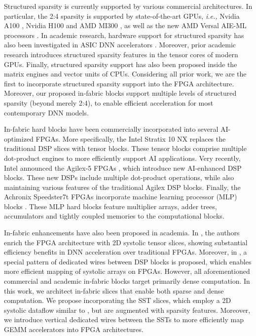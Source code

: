 



Structured sparsity is currently supported by various commercial architectures.
In particular, the 2:4 sparsity is supported by state-of-the-art GPUs, \emph{i.e.,} Nvidia A100 \cite{NVIDIA_A100}, Nvidia H100 \cite{NVIDIA_H100} and AMD MI300 \cite{AMD_CDNA_3}, as well as the new AMD Versal AIE-ML 
processors \cite{AMD_AIE_ML_architecture_manual, AMD_AIE_ML_kernel_guide}.
In academic research, hardware support for structured sparsity has also been investigated in ASIC DNN accelerators \cite{S2TA_HPCA_2022, STA_arch_letters_2020, HighLight_MIT_2023}.
Moreover, prior academic research \cite{Sparse_tensor_GPUs_2019} introduces structured sparsity features in the tensor cores of modern GPUs.
Finally, structured sparsity support has also been proposed inside the matrix engines \cite{Vegeta_HPCA_2023} and vector units \cite{RISC_V_CPU_structured_sparsity_DATE_2024} of CPUs.
Considering all prior work, we are the first to incorporate structured sparsity support into the FPGA architecture.
Moreover, our proposed in-fabric blocks support multiple levels of structured sparsity (beyond merely 2:4), to enable efficient acceleration for most contemporary DNN models.




In-fabric hard blocks have been commercially incorporated into several AI-optimized FPGAs.
More specifically, the Intel Stratix 10 NX \cite{Stratix_10_NX_FPGA_2021} replaces the traditional DSP slices with tensor blocks.
These tensor blocks comprise multiple dot-product engines to more efficiently support AI applications.
Very recently, Intel announced the Agilex-5 FPGAs \cite{Sergey_Intel_TB_Agilex_5_FCCM_2024, Intel_Agilex_5_tensor_blocks}, which introduce new AI-enhanced DSP blocks.
These new DSPs include multiple dot-product operations, while also maintaining various features of the traditional Agilex DSP blocks.
Finally, the Achronix Speedster7t FPGAs incorporate machine learning processor (MLP) blocks \cite{Achronix_Speedster, Achronix_Speedster_2024}.
These MLP hard blocks feature multiplier arrays, adder trees, accumulators and tightly coupled memories to the computational blocks.

In-fabric enhancements have also been proposed in academia.
In \cite{TS_Aman_FPGA_2021, Aman_TS_TRETS_2022}, the authors enrich the FPGA architecture with 2D systolic tensor slices, showing substantial efficiency benefits in DNN acceleration over traditional FPGAs.
Moreover, in \cite{PIR_DSP_FCCM_2019}, a special pattern of dedicated wires between DSP blocks is proposed, which enables more efficient mapping of systolic arrays on FPGAs.
However, all aforementioned commercial and academic in-fabric blocks target primarily dense computation.
In this work, we architect in-fabric slices that enable both sparse and dense computation.
We propose incorporating the SST slices, which employ a 2D systolic dataflow similar to \cite{TS_Aman_FPGA_2021, Aman_TS_TRETS_2022}, but are augmented with sparsity features.
Moreover, we introduce vertical dedicated wires between the SSTs to more efficiently map GEMM accelerators into FPGA architectures.



